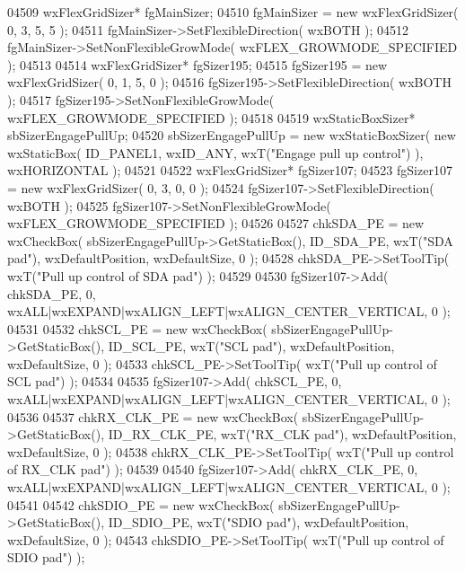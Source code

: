 \begin{DoxyCode}
04509     wxFlexGridSizer* fgMainSizer;
04510     fgMainSizer = \textcolor{keyword}{new} wxFlexGridSizer( 0, 3, 5, 5 );
04511     fgMainSizer->SetFlexibleDirection( wxBOTH );
04512     fgMainSizer->SetNonFlexibleGrowMode( wxFLEX\_GROWMODE\_SPECIFIED );
04513     
04514     wxFlexGridSizer* fgSizer195;
04515     fgSizer195 = \textcolor{keyword}{new} wxFlexGridSizer( 0, 1, 5, 0 );
04516     fgSizer195->SetFlexibleDirection( wxBOTH );
04517     fgSizer195->SetNonFlexibleGrowMode( wxFLEX\_GROWMODE\_SPECIFIED );
04518     
04519     wxStaticBoxSizer* sbSizerEngagePullUp;
04520     sbSizerEngagePullUp = \textcolor{keyword}{new} wxStaticBoxSizer( \textcolor{keyword}{new} wxStaticBox( ID_PANEL1, wxID\_ANY, wxT(\textcolor{stringliteral}{"Engage pull up
       control"}) ), wxHORIZONTAL );
04521     
04522     wxFlexGridSizer* fgSizer107;
04523     fgSizer107 = \textcolor{keyword}{new} wxFlexGridSizer( 0, 3, 0, 0 );
04524     fgSizer107->SetFlexibleDirection( wxBOTH );
04525     fgSizer107->SetNonFlexibleGrowMode( wxFLEX\_GROWMODE\_SPECIFIED );
04526     
04527     chkSDA_PE = \textcolor{keyword}{new} wxCheckBox( sbSizerEngagePullUp->GetStaticBox(), ID_SDA_PE, wxT(\textcolor{stringliteral}{"SDA pad"}), 
      wxDefaultPosition, wxDefaultSize, 0 );
04528     chkSDA_PE->SetToolTip( wxT(\textcolor{stringliteral}{"Pull up control of SDA pad"}) );
04529     
04530     fgSizer107->Add( chkSDA_PE, 0, wxALL|wxEXPAND|wxALIGN\_LEFT|wxALIGN\_CENTER\_VERTICAL, 0 );
04531     
04532     chkSCL_PE = \textcolor{keyword}{new} wxCheckBox( sbSizerEngagePullUp->GetStaticBox(), ID_SCL_PE, wxT(\textcolor{stringliteral}{"SCL pad"}), 
      wxDefaultPosition, wxDefaultSize, 0 );
04533     chkSCL_PE->SetToolTip( wxT(\textcolor{stringliteral}{"Pull up control of SCL pad"}) );
04534     
04535     fgSizer107->Add( chkSCL_PE, 0, wxALL|wxEXPAND|wxALIGN\_LEFT|wxALIGN\_CENTER\_VERTICAL, 0 );
04536     
04537     chkRX_CLK_PE = \textcolor{keyword}{new} wxCheckBox( sbSizerEngagePullUp->GetStaticBox(), 
      ID_RX_CLK_PE, wxT(\textcolor{stringliteral}{"RX\_CLK pad"}), wxDefaultPosition, wxDefaultSize, 0 );
04538     chkRX_CLK_PE->SetToolTip( wxT(\textcolor{stringliteral}{"Pull up control of RX\_CLK pad"}) );
04539     
04540     fgSizer107->Add( chkRX_CLK_PE, 0, wxALL|wxEXPAND|wxALIGN\_LEFT|wxALIGN\_CENTER\_VERTICAL, 0 );
04541     
04542     chkSDIO_PE = \textcolor{keyword}{new} wxCheckBox( sbSizerEngagePullUp->GetStaticBox(), ID_SDIO_PE, wxT(\textcolor{stringliteral}{"SDIO pad"}), 
      wxDefaultPosition, wxDefaultSize, 0 );
04543     chkSDIO_PE->SetToolTip( wxT(\textcolor{stringliteral}{"Pull up control of SDIO pad"}) );

\end{DoxyCode}
